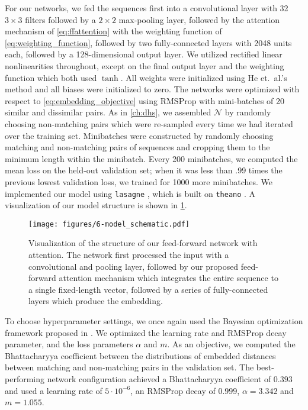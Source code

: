 For our networks, we fed the sequences first into a convolutional layer with 32 $3 \times 3$ filters followed by a $2 \times 2$ max-pooling layer, followed by the attention mechanism of \cref{eq:ffattention} with the weighting function of \cref{eq:weighting_function}, followed by two fully-connected layers with 2048 units each, followed by a 128-dimensional output layer.
We utilized rectified linear nonlinearities throughout, except on the final output layer and the weighting function which both used $\tanh$.
All weights were initialized using He et.\ al.'s method \cite{he2015delving} and all biases were initialized to zero.
The networks were optimized with respect to \cref{eq:embedding_objective} using RMSProp with mini-batches of 20 similar and dissimilar pairs.
As in \cref{ch:dhs}, we assembled $\mathcal{N}$ by randomly choosing non-matching pairs which were re-sampled every time we had iterated over the training set.
Minibatches were constructed by randomly choosing matching and non-matching pairs of sequences and cropping them to the minimum length within the minibatch.
Every 200 minibatches, we computed the mean loss on the held-out validation set; when it was less than .99 times the previous lowest validation loss, we trained for 1000 more minibatches.
We implemented our model using \texttt{lasagne} \cite{dieleman2015lasagne}, which is built on \texttt{theano} \cite{bergstra2010theano, bastien2012theano}.
A visualization of our model structure is shown in \cref{fig:model_schematic}.

\begin{figure}
  \texttt{[image: figures/6-model\_schematic.pdf]}
  \caption[Structure of our feed-forward attention network]{Visualization of the structure of our feed-forward network with attention.
The network first processed the input with a convolutional and pooling layer, followed by our proposed feed-forward attention mechanism which integrates the entire sequence to a single fixed-length vector, followed by a series of fully-connected layers which produce the embedding.}
  \label{fig:model_schematic}
\end{figure}

To choose hyperparameter settings, we once again used the Bayesian optimization framework proposed in \cite{snoek2012practical}.
We optimized the learning rate and RMSProp decay parameter, and the loss parameters $\alpha$ and $m$.
As an objective, we computed the Bhattacharyya coefficient \cite{bhattacharyya1943measure} between the distributions of embedded distances between matching and non-matching pairs in the validation set.
The best-performing network configuration achieved a Bhattacharyya coefficient of $0.393$ and used a learning rate of $5\cdot10^{-6}$, an RMSProp decay of $0.999$, $\alpha = 3.342$ and $m = 1.055$.

